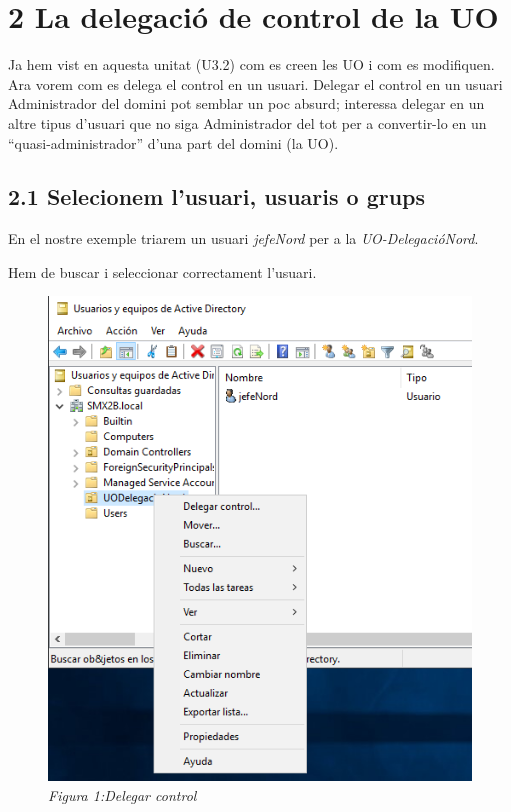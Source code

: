 \documentclass[
  a4paper,
]{article}
\begin{document}
\section{2 La delegació de control de la
UO}\label{la-delegaciuxf3-de-control-de-la-uo}

Ja hem vist en aquesta unitat (U3.2) com es creen les UO i com es
modifiquen. Ara vorem com es delega el control en un usuari. Delegar el
control en un usuari Administrador del domini pot semblar un poc absurd;
interessa delegar en un altre tipus d'usuari que no siga Administrador
del tot per a convertir-lo en un ``quasi-administrador'' d'una part del
domini (la UO).

\subsection{2.1 Selecionem l'usuari, usuaris o
grups}\label{selecionem-lusuari-usuaris-o-grups}

En el nostre exemple triarem un usuari \emph{jefeNord} per a la
\emph{UO-DelegacióNord}.

Hem de buscar i seleccionar correctament l'usuari.

\begin{figure}
\centering
\includegraphics{png/DelegarControl1.png}
\caption{\emph{Figura 1:Delegar control}}
\end{figure}
\end{document}
